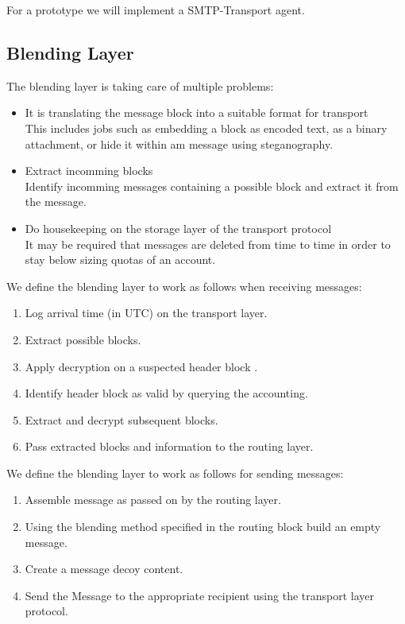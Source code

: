 For a prototype we will implement a SMTP-Transport agent.

\subsection{Blending Layer}
The blending layer is taking care of multiple problems:
\begin{itemize}
	\item It is translating the message block into a suitable format for transport\\
	      This includes jobs such as embedding a block as encoded text, as a binary attachment, or hide it within am message using steganography.
	\item Extract incomming blocks\\
	      Identify incomming messages containing a possible block and extract it from the message.
	\item Do housekeeping on the storage layer of the transport protocol\\
	      It may be required that messages are deleted from time to time in order to stay below sizing quotas of an account.      
\end{itemize}

We define the blending layer to work as follows when receiving messages:

\begin{enumerate}
	\item Log arrival time (in UTC) on the transport layer.
	\item Extract possible blocks.
	\item Apply decryption on a suspected header block .
	\item Identify header block as valid by querying the accounting.
	\item Extract and decrypt subsequent blocks.
	\item Pass extracted blocks and information to the routing layer.
\end{enumerate}

We define the blending layer to work as follows for sending messages:

\begin{enumerate}
	\item Assemble message as passed on by the routing layer.
	\item Using the blending method specified in the routing block build an empty message. 
	\item Create a message decoy content.
	\item Send the Message to the appropriate recipient using the transport layer protocol.
\end{enumerate}

